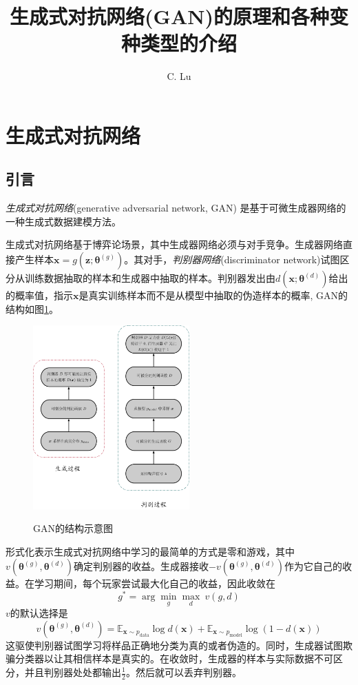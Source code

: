 \documentclass[11pt]{ctexart}
\title{ \textbf{生成式对抗网络(GAN)的原理和各种变种类型的介绍} }
\author{C. Lu}
\begin{document}
\maketitle

\section{生成式对抗网络}
\subsection{引言}
\emph{生成式对抗网络}(generative adversarial network, GAN)\cite{goodfellow2014generative} 是基于可微生成器网络的一种生成式数据建模方法。

生成式对抗网络基于博弈论场景，其中生成器网络必须与对手竞争。生成器网络直接产生样本$\bm x = g(\bm z; \bm \theta^{(g)})$。其对手，\emph{判别器网络}(discriminator network)试图区分从训练数据抽取的样本和生成器中抽取的样本。判别器发出由$d(\bm x; \bm \theta^{(d)})$给出的概率值，指示$\bm x$是真实训练样本而不是从模型中抽取的伪造样本的概率, GAN的结构如图\ref{gan}。

\begin{figure}[htbp]
	\centering
	\includegraphics[width=6cm]{GAN}
	\label{gan}
	\caption{GAN的结构示意图}
\end{figure}

形式化表示生成式对抗网络中学习的最简单的方式是零和游戏，其中$v(\bm\theta^{(g)}, \bm\theta^{(d)})$确定判别器的收益。生成器接收$-v(\bm\theta^{(g)}, \bm\theta^{(d)})$作为它自己的收益。在学习期间，每个玩家尝试最大化自己的收益，因此收敛在
	\begin{equation}
	\label{eq:minimax}
		g^* = \arg \min_{g} \max_{d} \ v(g, d)
	\end{equation}		
$v$的默认选择是
	\begin{equation}
		v(\bm \theta^{(g)}, \bm \theta^{(d)}) = \mathbb{E}_{\bm x\sim p_{\mathrm{data}}}\log d(\bm x) + \mathbb{E}_{\bm x\sim p_{\mathrm{model}}}\log(1-d(\bm x))
	\end{equation}
	这驱使判别器试图学习将样品正确地分类为真的或者伪造的。同时，生成器试图欺骗分类器以让其相信样本是真实的。在收敛时，生成器的样本与实际数据不可区分，并且判别器处处都输出$\frac{1}{2}$。然后就可以丢弃判别器。
	
\end{document}
